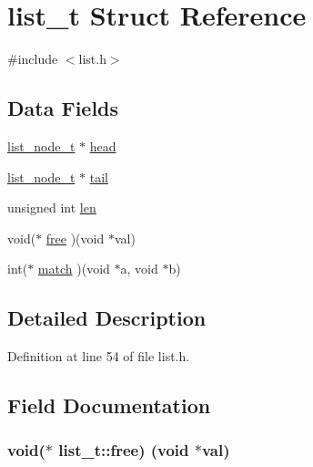 \hypertarget{structlist__t}{}\section{list\+\_\+t Struct Reference}
\label{structlist__t}


{\ttfamily \#include $<$list.\+h$>$}

\subsection*{Data Fields}
\begin{DoxyCompactItemize}
\item 
\hyperlink{list_8h_ad8b8636e2e25308b521b32071e849c80}{list\+\_\+node\+\_\+t} $\ast$ \hyperlink{structlist__t_a93ef6d995af96e73e226dc2b8a7232aa}{head}
\item 
\hyperlink{list_8h_ad8b8636e2e25308b521b32071e849c80}{list\+\_\+node\+\_\+t} $\ast$ \hyperlink{structlist__t_a45dc80e38f8869f66e5d006117aae5f2}{tail}
\item 
unsigned int \hyperlink{structlist__t_aba275113a143fe39c162f547c6792502}{len}
\item 
void($\ast$ \hyperlink{structlist__t_adbc5f9e0707a09a027c89218ff0a8f69}{free} )(void $\ast$val)
\item 
int($\ast$ \hyperlink{structlist__t_a3cf6cc60206869f52386f1f72e161839}{match} )(void $\ast$a, void $\ast$b)
\end{DoxyCompactItemize}


\subsection{Detailed Description}


Definition at line 54 of file list.\+h.



\subsection{Field Documentation}
\subsubsection[{\texorpdfstring{free}{free}}]{\setlength{\rightskip}{0pt plus 5cm}void($\ast$ list\+\_\+t\+::free) (void $\ast$val)}\hypertarget{structlist__t_adbc5f9e0707a09a027c89218ff0a8f69}{}\label{structlist__t_adbc5f9e0707a09a027c89218ff0a8f69}


